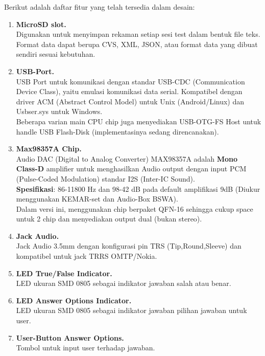 \documentclass[12pt,]{article}
\begin{document}
	Berikut adalah daftar fitur yang telah tersedia dalam desain:
	\begin{enumerate}
		\item \textbf{MicroSD slot.}\\
		Digunakan untuk menyimpan rekaman setiap sesi test dalam bentuk file teks.
		Format data dapat berupa CVS, XML, JSON, atau format data yang dibuat sendiri sesuai kebutuhan.
		
		\item \textbf{USB-Port.}\\
		USB Port untuk komunikasi dengan standar USB-CDC (Communication Device Class), yaitu emulasi komunikasi data serial.
		Kompatibel dengan driver ACM (Abstract Control Model) untuk Unix (Android/Linux) dan Usbser.sys untuk Windows.\\
		Beberapa varian main CPU chip juga menyediakan USB-OTG-FS Host untuk handle USB Flash-Disk (implementasinya sedang direncanakan).
				
		\newpage
		\item \textbf{Max98357A Chip.}\\
		Audio DAC (Digital to Analog Converter) MAX98357A adalah \textbf{Mono Class-D} amplifier untuk menghasilkan Audio output dengan input
		PCM (Pulse-Coded Modulation) standar I2S (Inter-IC Sound).\\
		\textbf{Spesifikasi}: 86-11800 Hz dan 98-42 dB pada default amplifikasi 9dB (Diukur menggunakan KEMAR-set dan Audio-Box BSWA).\\
		Dalam versi ini, menggunakan chip berpaket QFN-16 sehingga cukup space untuk 2 chip dan menyediakan output dual (bukan stereo). 
		
		\item \textbf{Jack Audio.}\\ 
		Jack Audio 3.5mm dengan konfigurasi pin TRS (Tip,Round,Sleeve) dan kompatibel untuk jack TRRS OMTP/Nokia.
		
		\item \textbf{LED True/False Indicator.}\\
		LED ukuran SMD 0805 sebagai indikator jawaban salah atau benar.
		
		\item \textbf{LED Answer Options Indicator.}\\
		LED ukuran SMD 0805 sebagai indikator jawaban pilihan jawaban untuk user.
		
		\item \textbf{User-Button Answer Options.}\\
		Tombol untuk input user terhadap jawaban.
		

\end{enumerate}
\end{document}
